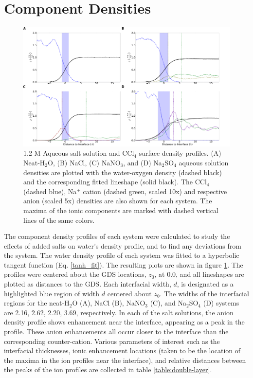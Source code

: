 \section{Component Densities}

\begin{figure}[h!]
\begin{center}
	\includegraphics[scale=1.0]{images/densities.png}
	\caption{1.2 M Aqueous salt solution and CCl$_4$ surface density profiles. (A) Neat-H$_2$O, (B) NaCl, (C) NaNO$_3$, and (D) Na$_2$SO$_4$ aqueous solution densities are plotted with the water-oxygen density (dashed black) and the corresponding fitted lineshape (solid black). The CCl$_4$ (dashed blue), Na$^+$ cation (dashed green, scaled 10x) and respective anion (scaled 5x) densities are also shown for each system. The maxima of the ionic components are marked with dashed vertical lines of the same colors.}
	\label{fig:density-plots}
\end{center}
\end{figure}

The component density profiles of each system were calculated to study the effects of added salts on water's density profile, and to find any deviations from the \ctcwat system. The water density profile of each system was fitted to a hyperbolic tangent function (Eq. \ref{tanh_fit}). The resulting plots are shown in figure \ref{fig:density-plots}. The profiles were centered about the GDS locations, $z_0$, at 0.0\angs, and all lineshapes are plotted as distances to the GDS. Each interfacial width, $d$, is designated as a highlighted blue region of width $d$ centered about $z_0$.  The widths of the interfacial regions for the neat-H$_2$O (A), NaCl (B), NaNO$_3$ (C), and Na$_2$SO$_4$ (D) systems are 2.16, 2.62, 2.20, 3.69\angs, respectively. In each of the salt solutions, the anion density profile shows enhancement near the interface, appearing as a peak in the profile. These anion enhancements all occur closer to the interface than the corresponding counter-cation. Various parameters of interest such as the interfacial thicknesses, ionic enhancement locations (taken to be the location of the maxima in the ion profiles near the interface), and relative distances between the peaks of the ion profiles are collected in table \ref{table:double-layer}.

